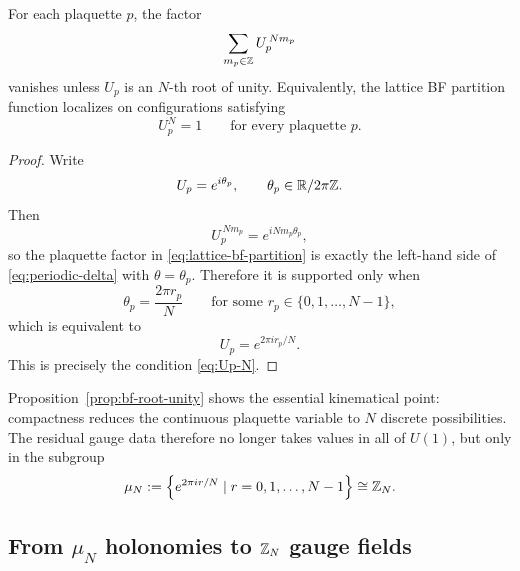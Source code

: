 \begin{proposition}\label{prop:bf-root-unity}
For each plaquette $p$, the factor
\begin{equation}\label{eq:root-unity-projector}
\sum_{m_p\in \mathbb{Z}} U_p^{\,Nm_p}
\end{equation}
vanishes unless $U_p$ is an $N$-th root of unity. Equivalently, the lattice BF partition function localizes on configurations satisfying
\begin{equation}\label{eq:Up-N}
U_p^N = 1
\qquad
\text{for every plaquette }p.
\end{equation}
\end{proposition}

\begin{proof}
Write
\begin{equation*}
U_p = e^{i\theta_p},
\qquad
\theta_p \in \mathbb{R}/2\pi\mathbb{Z}.
\end{equation*}
Then
\begin{equation*}
U_p^{\,Nm_p}=e^{iNm_p\theta_p},
\end{equation*}
so the plaquette factor in \eqref{eq:lattice-bf-partition} is exactly the left-hand side of \eqref{eq:periodic-delta} with $\theta=\theta_p$. Therefore it is supported only when
\begin{equation*}
\theta_p = \frac{2\pi r_p}{N}
\qquad
\text{for some }r_p\in\{0,1,\dots,N-1\},
\end{equation*}
which is equivalent to
\begin{equation*}
U_p = e^{2\pi i r_p/N}.
\end{equation*}
This is precisely the condition \eqref{eq:Up-N}.
\end{proof}

\noindent Proposition~\ref{prop:bf-root-unity} shows the essential kinematical point: compactness reduces the continuous plaquette variable to $N$ discrete possibilities. The residual gauge data therefore no longer takes values in all of $U(1)$, but only in the subgroup
\begin{equation}\label{eq:muN}
\mu_N := \left\{e^{2\pi i r/N}\mid r=0,1,\dots,N-1\right\}\cong \mathbb{Z}_N.
\end{equation}

\subsection{From \texorpdfstring{$\mu_N$}{mu\_N} holonomies to \texorpdfstring{$\mathbb{Z}_N$}{Z\_N} gauge fields}

